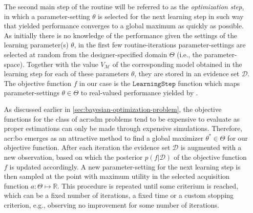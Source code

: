 The second main step of the routine will be referred to as the \textit{optimization step}, in which a parameter-setting $\theta$ is selected for the next learning step in such way that yielded performance converges to a global maximum as quickly as possible.
As initially there is no knowledge of the performance given the settings of the learning parameter(s) $\theta$, in the first few routine-iterations parameter-settings are selected at random from the designer-specified domain $\Theta$ (i.e., the parameter-space).
Together with the value $V_{\mathcal{M}}$ of the corresponding model obtained in the learning step for each of these parameters $\theta$, they are stored in an evidence set $\mathcal{D}$.
The objective function $f$ in our case is the $\texttt{LearningStep}$ function which maps parameter-settings $\theta \in \Theta$ to real-valued performance yielded by .

As discussed earlier in  \autoref{sec:bayesian-optimization-problem}, the objective functions for the class of \acrshort{acr:sdm} problems tend to be expensive to evaluate as proper estimations can only be made through expensive simulations.
Therefore, \acrlong{acr:bo} emerges as an attractive method to find a global maximizer $\theta^\ast \in \Theta$ for our objective function.
After each iteration the evidence set $\mathcal{D}$ is augmented with a new observation, based on which the posterior $p(f\vert \mathcal{D})$ of the objective function $f$ is updated accordingly.
A new parameter-setting for the next learning step is then sampled at the point with maximum utility in the selected acquisition function $a: \Theta \mapsto \mathbb{R}$.
This procedure is repeated until some criterium is reached, which can be a fixed number of iterations, a fixed time or a custom stopping criterion, e.g., observing no improvement for some number of iterations.


